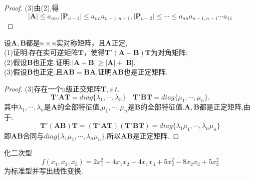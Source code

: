 \documentclass[lang=cn,11pt,normal]{elegantbook}
\begin{document}
	\begin{proof}
		(3)由(2),得
		$$
		|\boldsymbol{A}|\leq a_{nn},|\boldsymbol{P}_{n-1}|\leq a_{nn}a_{n-1,n-1},|\boldsymbol{P}_{n-2}|\leq \cdots\leq a_{nn}a_{n-1,n-1}\cdots a_{11}
		$$
	\end{proof}
	\begin{exercise}
		设$\boldsymbol{A},\boldsymbol{B}$都是$n\times n$实对称矩阵，且$\boldsymbol{A}$正定,\\
		(1)证明:存在实可逆矩阵$\boldsymbol{T}$，使得$\boldsymbol{T}'(\boldsymbol{A}+\boldsymbol{B})\boldsymbol{T}$为对角矩阵;\\
		(2)假设$\boldsymbol{B}$也正定.证明:$|\boldsymbol{A}+\boldsymbol{B}|\geq|\boldsymbol{A}|+|\boldsymbol{B}|.$\\
		(3)假设$\boldsymbol{B}$也正定,且$\boldsymbol{A}\boldsymbol{B}=\boldsymbol{B}\boldsymbol{A}$,证明$\boldsymbol{A}\boldsymbol{B}$也是正定矩阵.
	\end{exercise}
	\begin{proof}
		(3)存在一个n级正交矩阵$\boldsymbol{T},s.t.$
		$$
		\boldsymbol{T}'\boldsymbol{AT}=diag\{\lambda_1,\cdots,\lambda_n\}\quad\boldsymbol{T}'\boldsymbol{BT}=diag\{\mu_1,\cdots,\mu_n\}.
		$$
		其中$\lambda_1,\cdots,\lambda_n$是$\boldsymbol{A}$的全部特征值,$\mu_1,\cdots,\mu_n$是$\boldsymbol{B}$的全部特征值.$\boldsymbol{A},\boldsymbol{B}$都是正定矩阵,由于:
		$$
		\boldsymbol{T}'(\boldsymbol{AB})\boldsymbol{T}=(\boldsymbol{T}'\boldsymbol{AT})(\boldsymbol{T}'\boldsymbol{BT})=diag\{\lambda_1\mu_1,\cdots,\lambda_n\mu_n \}
		$$
		即$\boldsymbol{AB}$合同与$diag\{\lambda_1\mu_1,\cdots,\lambda_n\mu_n \}$,所以$\boldsymbol{AB}$是正定矩阵.
	\end{proof}
	\begin{exercise}
		化二次型
		$$
		f(x_1,x_2,x_3)=2x_1^2+4x_1x_2-4x_1x_3+5x_2^2-8x_2x_3+5x_3^2
		$$
		为标准型并写出线性变换.
	\end{exercise}
\end{document}
